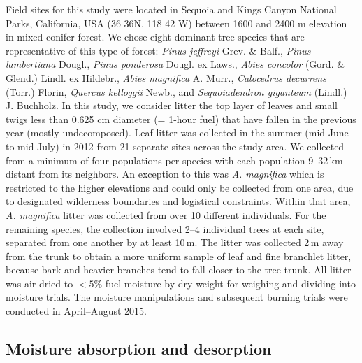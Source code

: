 \documentclass[letterpaper,12pt]{article}
\begin{document}
Field sites for this study were located in Sequoia and Kings Canyon National
Parks, California, USA (36 36N, 118 42 W) between 1600 and 2400 m elevation in
mixed-conifer forest. We chose eight dominant tree species that are
representative of this type of forest: \emph{Pinus jeffreyi} Grev. \& Balf.,
\emph{Pinus lambertiana} Dougl., \emph{Pinus ponderosa} Dougl. ex Laws.,
\emph{Abies concolor} (Gord. \& Glend.) Lindl. ex Hildebr., \emph{Abies
  magnifica} A. Murr., \emph{Calocedrus decurrens} (Torr.) Florin,
\emph{Quercus kelloggii} Newb., and \emph{Sequoiadendron giganteum} (Lindl.) J.
Buchholz. In this study, we consider litter the top layer of leaves and small
twigs less than 0.625 cm diameter (= 1-hour fuel) that have fallen in the
previous year (mostly undecomposed). Leaf litter was collected in the summer
(mid-June to mid-July) in 2012 from 21 separate sites across the
study area. We collected from a minimum of four populations per species with
each population 9--32\,km distant from its neighbors. An exception to this was
\emph{A. magnifica} which is restricted to the higher elevations and could only
be collected from one area, due to designated wilderness boundaries and
logistical constraints. Within that area, \emph{A. magnifica} litter was
collected from over 10 different individuals. For the remaining species, the
collection involved 2--4 individual trees at each site, separated from one
another by at least 10\,m. The litter was collected 2\,m away from the trunk to
obtain a more uniform sample of leaf and fine branchlet litter, because bark
and heavier branches tend to fall closer to the tree trunk. All litter was air
dried to $< 5$\% fuel moisture by dry weight for weighing and dividing into
moisture trials. The moisture manipulations and subsequent burning trials were
conducted in April--August 2015.

\subsection*{Moisture absorption and desorption}
\end{document}
